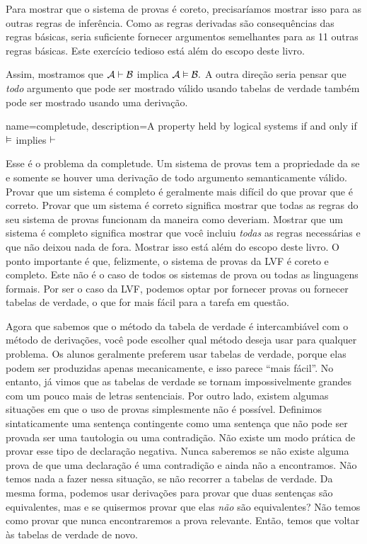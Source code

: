 Para mostrar que o sistema de provas \'e coreto, precisar\'iamos mostrar isso para as outras regras de infer\^encia. Como as regras derivadas s\~ao consequ\^encias das regras b\'asicas, seria suficiente fornecer argumentos semelhantes para as 11 outras regras b\'asicas. Este exerc\'icio tedioso est\'a al\'em do escopo deste livro.


Assim, mostramos que $\mathcal{A} \vdash  \mathcal{B}$ implica $\mathcal{A} \vDash \mathcal{B}.$ A outra dire\c c\~ao seria pensar que \emph{todo} argumento que pode ser mostrado v\'alido usando tabelas de verdade tamb\'em pode ser mostrado usando uma deriva\c c\~ao.

{
name=completude,
description={A property held by logical systems if and only if $\vDash $ implies $\vdash $}
}

Esse \'e o problema da completude. Um sistema de provas tem a propriedade da    \label{def:completeness} se e somente se houver uma deriva\c c\~ao de todo argumento semanticamente v\'alido. Provar que um sistema \'e completo \'e geralmente mais dif\'icil do que provar que \'e correto. Provar que um sistema \'e correto significa mostrar que todas as regras do seu sistema de provas funcionam da maneira como deveriam.
Mostrar que um sistema \'e completo significa mostrar que voc\^e incluiu \emph{todas} as regras necess\'arias e que n\~ao deixou nada de fora. Mostrar isso est\'a al\'em do escopo deste livro. O ponto importante \'e que, felizmente, o sistema de provas da LVF \'e coreto e completo. Este n\~ao \'e o caso de todos os sistemas de prova ou todas as linguagens formais. Por ser o caso da LVF, podemos optar por fornecer provas ou fornecer tabelas de verdade, o que for mais f\'acil para a tarefa em quest\~ao.

Agora que sabemos que o m\'etodo da tabela de verdade \'e intercambi\'avel com o m\'etodo de deriva\c c\~oes, voc\^e pode escolher qual m\'etodo deseja usar para qualquer problema. Os alunos geralmente preferem usar tabelas de verdade, porque elas podem ser produzidas apenas mecanicamente, e isso parece ``mais f\'acil''. No entanto, j\'a vimos que as tabelas de verdade se tornam impossivelmente grandes com um pouco mais de letras sentenciais.
Por outro lado, existem algumas situa\c c\~oes em que o uso de provas simplesmente n\~ao \'e poss\'ivel. Definimos sintaticamente uma senten\c ca contingente como uma senten\c ca que n\~ao pode ser provada ser uma tautologia ou uma contradi\c c\~ao. N\~ao existe um modo pr\'atica de provar esse tipo de declara\c c\~ao negativa. Nunca saberemos se n\~ao existe alguma prova de que uma declara\c c\~ao \'e uma contradi\c c\~ao e ainda n\~ao a encontramos. N\~ao temos nada a fazer nessa situa\c c\~ao, se n\~ao recorrer a tabelas de verdade. Da mesma forma, podemos usar deriva\c c\~oes para provar que duas senten\c cas s\~ao equivalentes, mas e se quisermos provar que elas \emph{n\~ao} s\~ao equivalentes? N\~ao temos como provar que nunca encontraremos a prova relevante. Ent\~ao, temos que voltar \`as tabelas de verdade de novo.

